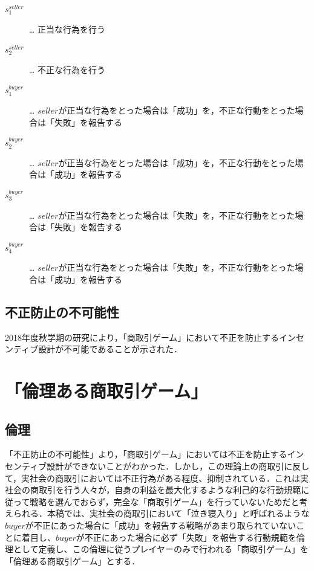\documentclass[twocolumn, a4j]{article}
\begin{document}
\begin{description}
  \item[$s^{seller}_1$]… 正当な行為を行う
  \item[$s^{seller}_2$]… 不正な行為を行う
  \item[$s^{buyer}_1$]… $ seller$が正当な行為をとった場合は「成功」を，不正な行動をとった場合は「失敗」を報告する
  \item[$s^{buyer}_2$]… $ seller$が正当な行為をとった場合は「成功」を，不正な行動をとった場合は「成功」を報告する
  \item[$s^{buyer}_3$]… $ seller$が正当な行為をとった場合は「失敗」を，不正な行動をとった場合は「失敗」を報告する
  \item[$s^{buyer}_4$]… $ seller$が正当な行為をとった場合は「失敗」を，不正な行動をとった場合は「成功」を報告する
\end{description}

\subsection{不正防止の不可能性}
2018年度秋学期の研究により，「商取引ゲーム」において不正を防止するインセンティブ設計が不可能であることが示された．

\section{「倫理ある商取引ゲーム」}

\subsection{倫理}
「不正防止の不可能性」より，「商取引ゲーム」においては不正を防止するインセンティブ設計ができないことがわかった．しかし，この理論上の商取引に反して，実社会の商取引においては不正行為がある程度、抑制されている．これは実社会の商取引を行う人々が，自身の利益を最大化するような利己的な行動規範に従って戦略を選んでおらず，完全な「商取引ゲーム」を行っていないためだと考えられる．本稿では、実社会の商取引において「泣き寝入り」と呼ばれるような$buyer$が不正にあった場合に「成功」を報告する戦略があまり取られていないことに着目し、$buyer$が不正にあった場合に必ず「失敗」を報告する行動規範を倫理として定義し、この倫理に従うプレイヤーのみで行われる「商取引ゲーム」を「倫理ある商取引ゲーム」とする．
\end{document}
